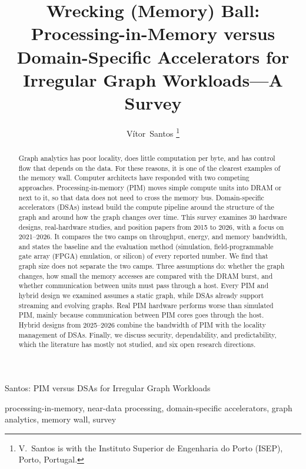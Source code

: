 \documentclass[journal,onecolumn]{IEEEtran}
\begin{document}
\title{Wrecking (Memory) Ball: Processing-in-Memory versus Domain-Specific Accelerators for Irregular Graph Workloads---A Survey}

\author{Vítor~Santos%
\thanks{V.~Santos is with the Instituto Superior de Engenharia do Porto (ISEP), Porto, Portugal.}}

%
{Santos: PIM versus DSAs for Irregular Graph Workloads}

\maketitle

\begin{abstract}
Graph analytics has poor locality, does little computation per byte, and has control flow that depends on the data. For these reasons, it is one of the clearest examples of the memory wall. Computer architects have responded with two competing approaches. Processing-in-memory (PIM) moves simple compute units into DRAM or next to it, so that data does not need to cross the memory bus. Domain-specific accelerators (DSAs) instead build the compute pipeline around the structure of the graph and around how the graph changes over time. This survey examines 30 hardware designs, real-hardware studies, and position papers from 2015 to 2026, with a focus on 2021--2026. It compares the two camps on throughput, energy, and memory bandwidth, and states the baseline and the evaluation method (simulation, field-programmable gate array (FPGA) emulation, or silicon) of every reported number. We find that graph size does not separate the two camps. Three assumptions do: whether the graph changes, how small the memory accesses are compared with the DRAM burst, and whether communication between units must pass through a host. Every PIM and hybrid design we examined assumes a static graph, while DSAs already support streaming and evolving graphs. Real PIM hardware performs worse than simulated PIM, mainly because communication between PIM cores goes through the host. Hybrid designs from 2025--2026 combine the bandwidth of PIM with the locality management of DSAs. Finally, we discuss security, dependability, and predictability, which the literature has mostly not studied, and six open research directions.
\end{abstract}

\begin{IEEEkeywords}
processing-in-memory, near-data processing, domain-specific accelerators, graph analytics, memory wall, survey
\end{IEEEkeywords}
\end{document}
